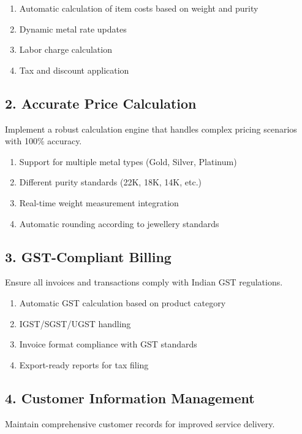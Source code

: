 \documentclass[12pt,a4paper]{report}
\begin{document}
\begin{enumerate}[label=\roman*)]
    \item Automatic calculation of item costs based on weight and purity
    \item Dynamic metal rate updates
    \item Labor charge calculation
    \item Tax and discount application
\end{enumerate}

\subsection{2. Accurate Price Calculation}

Implement a robust calculation engine that handles complex pricing scenarios with 100\% accuracy.

\begin{enumerate}[label=\roman*)]
    \item Support for multiple metal types (Gold, Silver, Platinum)
    \item Different purity standards (22K, 18K, 14K, etc.)
    \item Real-time weight measurement integration
    \item Automatic rounding according to jewellery standards
\end{enumerate}

\subsection{3. GST-Compliant Billing}

Ensure all invoices and transactions comply with Indian GST regulations.

\begin{enumerate}[label=\roman*)]
    \item Automatic GST calculation based on product category
    \item IGST/SGST/UGST handling
    \item Invoice format compliance with GST standards
    \item Export-ready reports for tax filing
\end{enumerate}

\subsection{4. Customer Information Management}

Maintain comprehensive customer records for improved service delivery.
\end{document}
